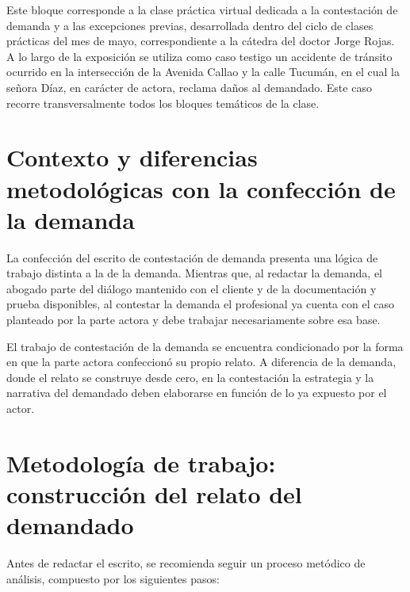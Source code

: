 \documentclass[12pt,oneside]{book}
\begin{document}
Este bloque corresponde a la clase práctica virtual dedicada a la contestación de demanda y a las excepciones previas, desarrollada dentro del ciclo de clases prácticas del mes de mayo, correspondiente a la cátedra del doctor Jorge Rojas. A lo largo de la exposición se utiliza como caso testigo un accidente de tránsito ocurrido en la intersección de la Avenida Callao y la calle Tucumán, en el cual la señora Díaz, en carácter de actora, reclama daños al demandado. Este caso recorre transversalmente todos los bloques temáticos de la clase.

\section{Contexto y diferencias metodológicas con la confección de la demanda}

La confección del escrito de contestación de demanda presenta una lógica de trabajo distinta a la de la demanda. Mientras que, al redactar la demanda, el abogado parte del diálogo mantenido con el cliente y de la documentación y prueba disponibles, al contestar la demanda el profesional ya cuenta con el caso planteado por la parte actora y debe trabajar necesariamente sobre esa base.

\begin{important}
El trabajo de contestación de la demanda se encuentra condicionado por la forma en que la parte actora confeccionó su propio relato. A diferencia de la demanda, donde el relato se construye desde cero, en la contestación la estrategia y la narrativa del demandado deben elaborarse en función de lo ya expuesto por el actor.
\end{important}

\section{Metodología de trabajo: construcción del relato del demandado}

Antes de redactar el escrito, se recomienda seguir un proceso metódico de análisis, compuesto por los siguientes pasos:
\end{document}
